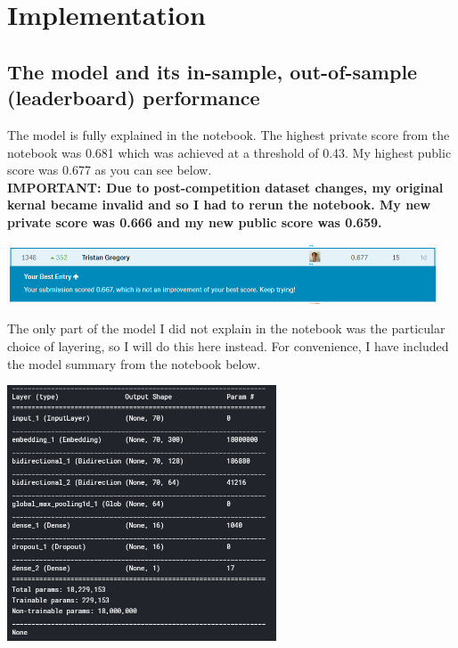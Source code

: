 \documentclass{article}
\begin{document}
\section{Implementation}
\subsection{The model and its in-sample, out-of-sample (leaderboard) performance}

The model is fully explained in the notebook. The highest private score from the notebook was 0.681 which was achieved at a threshold of 0.43. My highest public score was 0.677 as you can see below.\\

\textbf{IMPORTANT: Due to post-competition dataset changes, my original kernal became invalid and so I had to rerun the notebook. My new private score was 0.666 and my new public score was 0.659.}

\begin{center}
\includegraphics[width=12.8cm]{leaderboard.png}
\end{center}

The only part of the model I did not explain in the notebook was the particular choice of layering, so I will do this here instead. For convenience, I have included the model summary from the notebook below.

\begin{center}
\includegraphics[width=8cm]{summary.png}
\end{center}
\end{document}
